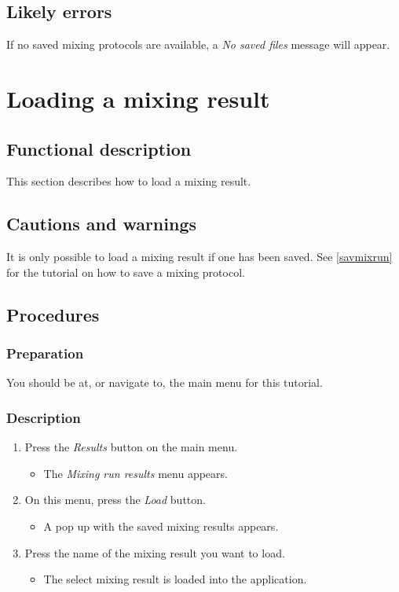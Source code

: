 \subsection{Likely errors}
If no saved mixing protocols are available, a \emph{No saved files} message will appear.


\section{Loading a mixing result}
\label{sec:loadMixResult}

\subsection{Functional description}
This section describes how to load a mixing result.

\subsection{Cautions and warnings}
It is only possible to load a mixing result if one has been saved. See \ref{savmixrun} for the tutorial on how to save a mixing protocol.

\subsection{Procedures}
\subsubsection{Preparation}
You should be at, or navigate to, the main menu for this tutorial.

\subsubsection{Description}

\begin{enumerate}
	\item Press the \emph{Results} button on the main menu. 
		\begin{itemize}
           \item  The \emph{Mixing run results} menu appears.
		\end{itemize}
	\item On this menu, press the \emph{Load} button. 
		\begin{itemize}
            \item A pop up with the saved mixing results appears.
		\end{itemize}
	\item  Press the name of the mixing result you want to load.
		\begin{itemize}
           \item  The select mixing result is loaded into the application.
		\end{itemize}
\end{enumerate}

